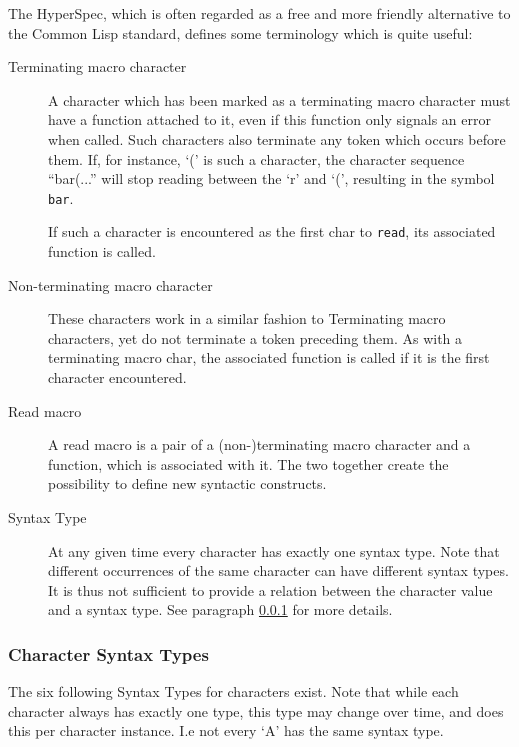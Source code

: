 \documentclass[a4paper,10pt,twoside]{article}
\newcommand{\cl}{Common Lisp}
\newcommand{\sym}[1]{\texttt{#1}}
\newcommand{\fun}[1]{\texttt{#1}}
\newcommand{\Read}{\fun{read}}
\begin{document}
The HyperSpec, which is often regarded as a free and more friendly alternative
to the \cl{} standard, defines some terminology which is quite useful:

\begin{description}
\item[Terminating macro character] A character which has been marked as a
  terminating macro character must have a function attached to it, even if this
  function only signals an error when called.  Such characters also terminate
  any token which occurs before them.  If, for instance, `(' is such a
  character, the character sequence ``bar(...'' will stop reading between the
  `r' and `(', resulting in the symbol \sym{bar}.

  If such a character is encountered as the first char to \Read{}, its
  associated function is called.
\item[Non-terminating macro character] These characters work in a similar
  fashion to Terminating macro characters, yet do not terminate a token
  preceding them.  As with a terminating macro char, the associated function is
  called if it is the first character encountered.
\item [Read macro] A read macro is a pair of a (non-)terminating macro character
  and a function, which is associated with it.  The two together create the
  possibility to define new syntactic constructs.
\item[Syntax Type] At any given time every character has exactly one syntax
  type.  Note that different occurrences of the same character can have
  different syntax types.  It is thus not sufficient to provide a relation
  between the character value and a syntax type.  See paragraph
  \ref{subsubsec:syntax-type} for more details.
\end{description}

\subsubsection{Character Syntax Types}
\label{subsubsec:syntax-type}

The six following Syntax Types for characters exist.  Note that while each
character always has exactly one type, this type may change over time, and does
this per character instance.  I.e not every `A' has the same syntax type.
\end{document}
